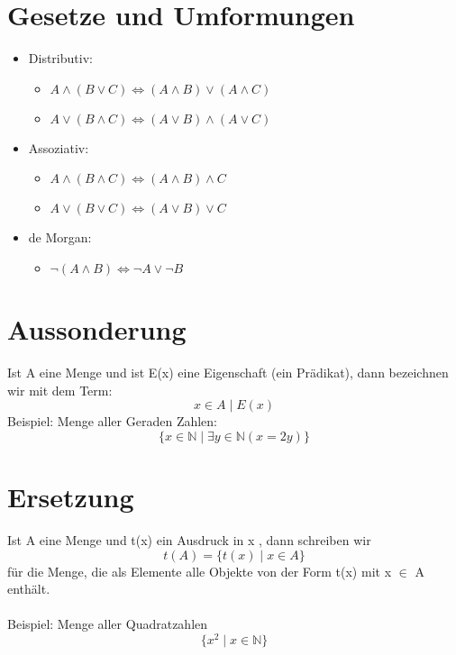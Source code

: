 \section{Gesetze und Umformungen}
\begin{itemize}
    \item Distributiv:
        \begin{itemize}
            \item \(A \wedge (B \vee C) \Leftrightarrow (A \wedge B) \vee (A \wedge C)\)
            \item \(A \vee (B \wedge C) \Leftrightarrow (A \vee B) \wedge (A \vee C)\)
        \end{itemize}
    
    \item Assoziativ:
        \begin{itemize}
            \item \(A \wedge (B \wedge C) \Leftrightarrow (A \wedge B) \wedge C\)
            \item \(A \vee (B \vee C) \Leftrightarrow (A \vee B) \vee C\)
        \end{itemize}
    
    \item de Morgan:
        \begin{itemize}
            \item \(\neg (A \wedge B) \Leftrightarrow \neg A \vee \neg B\)
        \end{itemize}
\end{itemize}

\section{Aussonderung}
Ist A eine Menge und ist E(x) eine Eigenschaft (ein Prädikat), dann
bezeichnen wir mit dem Term:
\begin{equation}
    x \in A \mid E(x)
\end{equation}
Beispiel: Menge aller Geraden Zahlen:
\begin{equation}
    \{x \in \mathbb{N} \mid \exists{y} \in \mathbb{N}(x= 2y)\}
\end{equation}
\section{Ersetzung}
Ist A eine Menge und t(x) ein Ausdruck in x , dann schreiben wir
\begin{equation}
    t(A) = \{t(x) \mid x \in A\}
\end{equation}
für die Menge, die als Elemente alle Objekte von der Form t(x) mit
x \(\in\) A enthält.\\\\
Beispiel: Menge aller Quadratzahlen
\begin{equation}
    \{x^2 \mid x \in \mathbb{N}\}
\end{equation}

